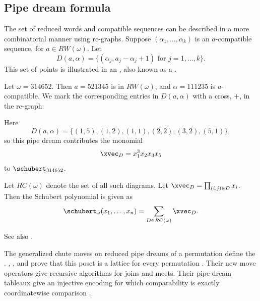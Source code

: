 \subsection[schubertPipeDream]{Pipe dream formula}

The set of reduced words and compatible sequences can be
described in a more combinatorial manner using rc-graphs.
Suppose $(\alpha_1,\dotsc,\alpha_k)$ is an $a$-compatible sequence, for $a\in RW(\omega)$.
Let
\[
D(a,\alpha) = \{ (\alpha_j, a_j - \alpha_j + 1) \text{ for } j=1,\dotsc,k \}.
\]
This set of points is illustrated in an \label{rcGraph}, also
known as a \label{pipeDream}.

\begin{example}
Let $\omega = 314652$. Then $a = 521345$ is in $RW(\omega)$,
and $\alpha = 111235$ is $a$-compatible.
We mark the corresponding entries in $D(a,\alpha)$ with a cross, $+$, in the rc-graph:

\begin{figure}
\end{figure}

Here
\[
  D(a,\alpha)=\{(1,5),(1,2),(1,1),(2,2),(3,2),(5,1)\},
\]
so this pipe dream contributes the monomial
\[
  \xvec_D=x_1^3x_2x_3x_5
\]
to $\schubert_{314652}$.
\end{example}

Let $RC(\omega)$ denote the set of all such diagrams.
Let $\xvec_D = \prod_{(i,j) \in D} x_i$. Then the Schubert polynomial is given as
\begin{equation*}
 \schubert_\omega(x_1,\dotsc,x_n) = \sum_{D \in RC(\omega)} \xvec_D.
\end{equation*}

See also \cite{FominKirillov1996YangBaxter}.

The generalized chute moves on reduced pipe dreams of a permutation define
the .  ,
, and  prove that this poset is
a lattice for every permutation \cite[Thm.~1.1]{BilleyMcCauslandMinnerath2026x}.
Their new move operators give recursive algorithms for joins and meets.  Their
pipe-dream tableaux give an injective encoding for which comparability is
exactly coordinatewise comparison
\cite[Thm.~1.3]{BilleyMcCauslandMinnerath2026x}.

